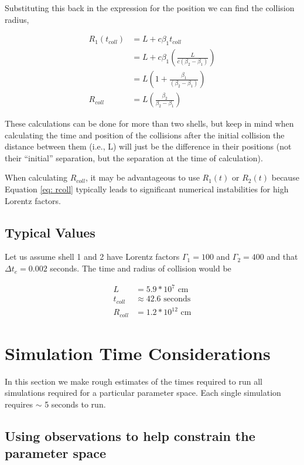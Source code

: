 \documentclass[linenumbers,twocolumn]{aastex631}
\begin{document}
\begin{appendix}
Substituting this back in the expression for the position we can find the collision radius, 

\begin{align}
	R_1(t_{coll}) &= L + c\beta_1 t_{coll} \\
	&= L+c\beta_1\left(\frac{L}{c(\beta_2-\beta_1)}\right) \\
	&= L\left(1+\frac{\beta_1}{(\beta_2-\beta_1)}\right)\\
	R_{coll} &= L\left(\frac{\beta_2}{\beta_2-\beta_1}\right) \label{eq: rcoll}
\end{align}

These calculations can be done for more than two shells, but keep in mind when calculating the time and position of the collisions after the initial collision the distance between them (i.e., L) will just be the difference in their positions (not their ``initial'' separation, but the separation at the time of calculation).

When calculating $R_{coll}$, it may be advantageous to use $R_1(t)$ or $R_2(t)$
because Equation \ref{eq: rcoll} typically leads to significant numerical instabilities for high Lorentz factors.

\subsection{Typical Values}

Let us assume shell 1 and 2 have Lorentz factors $\Gamma_1=100$ and $\Gamma_2=400$ and that $\Delta t_e = 0.002$ seconds. The time and radius of collision would be

\begin{align}
	L &= 5.9 * 10^7 \text{ cm} \\ 
	t_{coll} &\approx 42.6 \text{ seconds}\\
	R_{coll} &= 1.2*10^{12} \text{ cm}
\end{align}


\section{Simulation Time Considerations}

In this section we make rough estimates of the times required to run all simulations required for a particular parameter space. Each single simulation requires $\sim$ 5 seconds to run.

\subsection{Using observations to help constrain the parameter space}


\end{appendix}
\end{document}
